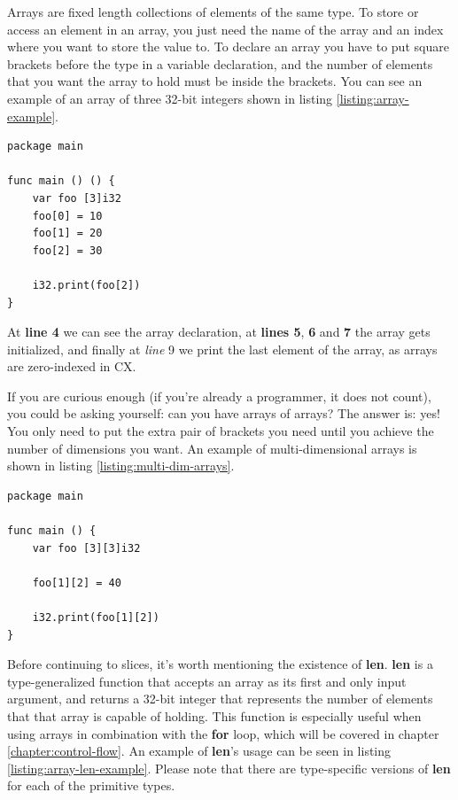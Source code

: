 \documentclass[11pt,fleqn,openany]{book} %
\begin{document}
Arrays are fixed length collections of elements of the same type. To store or access an element in an array, you just need the name of the array and an index where you want to store the value to. To declare an array you have to put square brackets before the type in a variable declaration, and the number of elements that you want the array to hold must be inside the brackets. You can see an example of an array of three 32-bit integers shown in listing \ref{listing:array-example}.

\begin{lstlisting}[caption={Array example},captionpos=b,label={listing:array-example}]
package main

func main () () {
	var foo [3]i32
	foo[0] = 10
	foo[1] = 20
	foo[2] = 30

	i32.print(foo[2])
}
\end{lstlisting}

At \textbf{line 4} we can see the array declaration, at \textbf{lines 5}, \textbf{6} and \textbf{7} the array gets initialized, and finally at \textit{line} 9 we print the last element of the array, as arrays are zero-indexed in CX.

If you are curious enough (if you're already a programmer, it does not count), you could be asking yourself: can you have arrays of arrays? The answer is: yes! You only need to put the extra pair of brackets you need until you achieve the number of dimensions you want. An example of multi-dimensional arrays is shown in listing \ref{listing:multi-dim-arrays}.

\begin{lstlisting}[caption={Multi-dimensional arrays},captionpos=b,label={listing:multi-dim-arrays}]
package main

func main () {
	var foo [3][3]i32
    
    foo[1][2] = 40
    
    i32.print(foo[1][2])
}
\end{lstlisting}

Before continuing to slices, it's worth mentioning the existence of \textbf{len}. \textbf{len} is a type-generalized function that accepts an array as its first and only input argument, and returns a 32-bit integer that represents the number of elements that that array is capable of holding. This function is especially useful when using arrays in combination with the \textbf{for} loop, which will be covered in chapter \ref{chapter:control-flow}. An example of \textbf{len}'s usage can be seen in listing \ref{listing:array-len-example}. Please note that there are type-specific versions of \textbf{len} for each of the primitive types.
\end{document}
